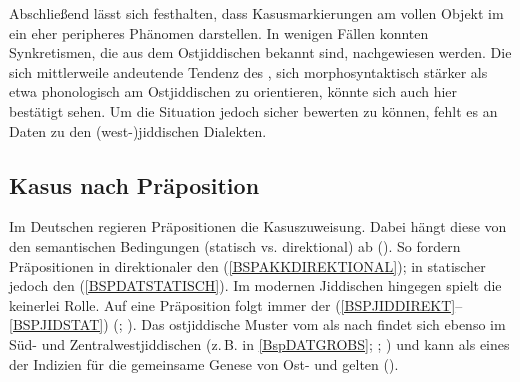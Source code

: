 Abschließend lässt sich festhalten, dass Kasusmarkierungen am vollen Objekt im  ein eher peripheres Phänomen darstellen. In wenigen Fällen konnten Synkretismen, die aus dem Ostjiddischen bekannt sind, nachgewiesen werden. Die sich mittlerweile andeutende Tendenz des , sich morphosyntaktisch stärker als etwa phonologisch am Ostjiddischen zu orientieren, könnte sich auch hier bestätigt sehen. Um die Situation jedoch sicher bewerten zu können, fehlt es an Daten zu den (west-)jiddischen Dialekten. \\
 
 
  \subsection{Kasus nach Präposition}\label{kasuspräp}
  
Im Deutschen regieren Präpositionen die Kasuszuweisung. Dabei hängt diese von den semantischen Bedingungen (statisch vs. direktional) ab (\cite[23]{PittnerBerman2007}). So fordern Präpositionen in direktionaler  den  (\ref{BSPAKKDIREKTIONAL}); in statischer  jedoch den  (\ref{BSPDATSTATISCH}). Im modernen Jiddischen hingegen spielt die  keinerlei Rolle. Auf eine Präposition folgt immer der  (\ref{BSPJIDDIREKT}–\ref{BSPJIDSTAT}) (\cite[202]{Jacobs2005}; \cite{FleischerSchaefer2012}). Das ostjiddische Muster vom  als  nach  findet sich ebenso im Süd- und Zentralwestjiddischen (z.\,B. in \ref{BspDATGROBS}; \cite{FleischerSchaefer2012}; \cite[24]{GuggenheimGruenberg1966}) und kann als eines der Indizien für die gemeinsame Genese von Ost- und  gelten (\cite{Fleischer2014}).\\
 
